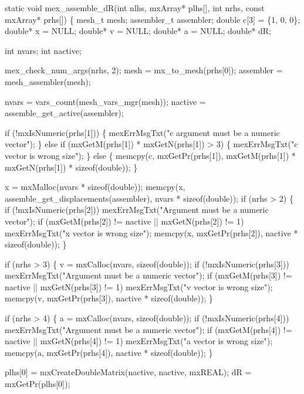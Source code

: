 \nwenddocs{}\plusendmoddef
static void mex_assemble_dR(int nlhs, mxArray* plhs[],
                            int nrhs, const mxArray* prhs[])
\{
    mesh_t      mesh;
    assembler_t assembler;
    double      c[3] = \{1, 0, 0\};
    double*     x = NULL;
    double*     v = NULL;
    double*     a = NULL;
    double*     dR;

    int nvars;
    int nactive;

    mex_check_num_args(nrhs, 2);
    mesh      = mx_to_mesh(prhs[0]);
    assembler = mesh_assembler(mesh);

    nvars   = vars_count(mesh_vars_mgr(mesh));
    nactive = assemble_get_active(assembler);

    if (!mxIsNumeric(prhs[1])) \{
        mexErrMsgTxt("c argument must be a numeric vector");
    \} else if (mxGetM(prhs[1]) * mxGetN(prhs[1]) > 3) \{
        mexErrMsgTxt("c vector is wrong size");
    \} else \{
        memcpy(c, mxGetPr(prhs[1]), 
               mxGetM(prhs[1]) * mxGetN(prhs[1]) * sizeof(double));
    \}

    x = mxMalloc(nvars * sizeof(double));
    memcpy(x, assemble_get_displacements(assembler), nvars * sizeof(double));
    if (nrhs > 2) \{
        if (!mxIsNumeric(prhs[2]))
            mexErrMsgTxt("Argument must be a numeric vector");
        if (mxGetM(prhs[2]) != nactive || mxGetN(prhs[2]) != 1)
            mexErrMsgTxt("x vector is wrong size");
        memcpy(x, mxGetPr(prhs[2]), nactive * sizeof(double));
    \}

    if (nrhs > 3) \{
        v = mxCalloc(nvars, sizeof(double));
        if (!mxIsNumeric(prhs[3]))
            mexErrMsgTxt("Argument must be a numeric vector");
        if (mxGetM(prhs[3]) != nactive || mxGetN(prhs[3]) != 1)
            mexErrMsgTxt("v vector is wrong size");
        memcpy(v, mxGetPr(prhs[3]), nactive * sizeof(double));
    \}

    if (nrhs > 4) \{
        a = mxCalloc(nvars, sizeof(double));
        if (!mxIsNumeric(prhs[4]))
            mexErrMsgTxt("Argument must be a numeric vector");
        if (mxGetM(prhs[4]) != nactive || mxGetN(prhs[4]) != 1)
            mexErrMsgTxt("a vector is wrong size");
        memcpy(a, mxGetPr(prhs[4]), nactive * sizeof(double));
    \}

    plhs[0] = mxCreateDoubleMatrix(nactive, nactive, mxREAL);
    dR      = mxGetPr(plhs[0]);

